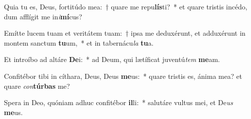 \item Quia tu es, Deus, fortitúdo mea:~† quare me repu\textbf{lís}ti?~* et quare tristis incédo, dum afflígit me in\textit{i}\textbf{mí}cus?
\item Emítte lucem tuam et veritátem tuam:~† ipsa me deduxérunt, et adduxérunt in montem sanctum \textbf{tu}um,~* et in tabernácu\textit{la} \textbf{tu}a.
\item Et introíbo ad altáre \textbf{De}i:~* ad Deum, qui lætíficat juventú\textit{tem} \textbf{me}am.
\item Confitébor tibi in cíthara, Deus, Deus \textbf{me}us:~* quare tristis es, ánima mea? et quare \textit{con}\textbf{túr}\textbf{bas} me?
\item Spera in Deo, quóniam adhuc confitébor \textbf{il}li:~* salutáre vultus mei, et De\textit{us} \textbf{me}us.
